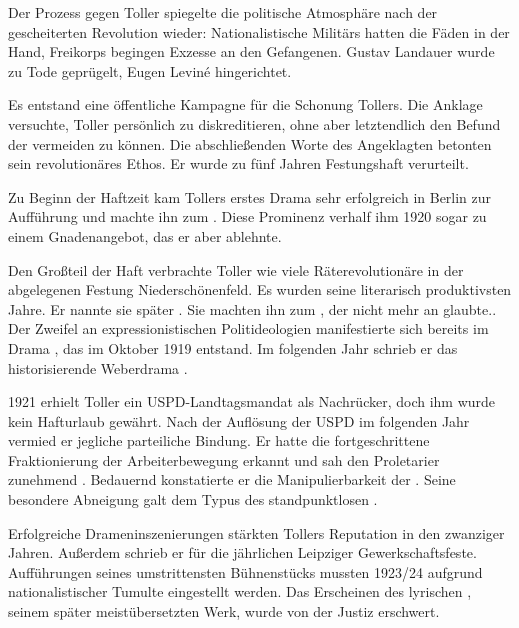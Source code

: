 
Der Prozess gegen Toller spiegelte die politische Atmosphäre nach der
gescheiterten Revolution wieder: Nationalistische Militärs hatten die Fäden in
der Hand, Freikorps begingen Exzesse an den Gefangenen. Gustav Landauer wurde
zu Tode geprügelt, Eugen Leviné hingerichtet.

Es entstand eine öffentliche Kampagne für die Schonung Tollers.  Die Anklage
versuchte, Toller persönlich zu diskreditieren, ohne aber letztendlich den Befund
der \Cite{Ehrenhaftigkeit} vermeiden zu können. Die abschließenden Worte des
Angeklagten betonten sein revolutionäres Ethos. 
Er wurde zu fünf Jahren Festungshaft verurteilt.

Zu Beginn der Haftzeit kam Tollers erstes Drama \Cite{Die Wandlung} sehr
erfolgreich in Berlin zur Aufführung und machte ihn zum \Cite{berühmtesten
politischen Gefangenen Deutschlands}. 
Diese Prominenz verhalf ihm 1920 sogar zu einem Gnadenangebot, das er aber ablehnte.

Den Großteil der Haft verbrachte Toller wie viele Räterevolutionäre in der
abgelegenen Festung Niederschönenfeld. Es wurden seine literarisch
produktivsten Jahre. Er nannte sie später \Cite{eine Schule des Lebens}. Sie
machten ihn zum \Cite{scharfäugigen Realisten}, der nicht mehr an
\Cite{Wandlung zu neuem Menschentum} glaubte.. Der Zweifel an
expressionistischen Politideologien manifestierte sich bereits im Drama
\Cite{Masse Mensch}, das im Oktober 1919 entstand.  Im folgenden Jahr schrieb er
das historisierende Weberdrama \Cite{Die Maschinenstürmer}.

1921 erhielt Toller ein USPD-Landtagsmandat als Nachrücker, doch ihm wurde
kein Hafturlaub gewährt. Nach der Auflösung der USPD im folgenden Jahr vermied
er jegliche parteiliche Bindung. Er hatte die fortgeschrittene Fraktionierung
der Arbeiterbewegung erkannt und sah den Proletarier zunehmend \Cite{in seiner
banalen Realität}. 
Bedauernd konstatierte er die Manipulierbarkeit der
\Cite{Massen}. Seine besondere Abneigung galt dem Typus des standpunktlosen
\Cite{Realpolitikers}.

Erfolgreiche Drameninszenierungen stärkten Tollers Reputation in den zwanziger
Jahren. Außerdem schrieb er \Cite{Massenspiele} für die jährlichen Leipziger
Gewerkschaftsfeste. Aufführungen seines umstrittensten Bühnenstücks \Cite{Der
deutsche Hinkemann} mussten 1923/24 aufgrund nationalistischer Tumulte
eingestellt werden. Das Erscheinen des lyrischen \Cite{Schwalbenbuchs}, seinem
später meistübersetzten Werk, wurde von der Justiz erschwert.

